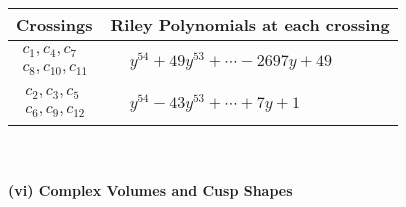 \documentclass[1p]{elsarticle_modified}
\theoremstyle{definition}
\begin{document}
\begin{tabular}{m{50pt}|m{274pt}}
Crossings & \hspace{64pt}Riley Polynomials at each crossing \\
\hline $$\begin{aligned}c_{1},c_{4},c_{7}\\c_{8},c_{10},c_{11}\end{aligned}$$&$\begin{aligned}
&y^{54}+49 y^{53}+\cdots-2697 y+49
\end{aligned}$\\
\hline $$\begin{aligned}c_{2},c_{3},c_{5}\\c_{6},c_{9},c_{12}\end{aligned}$$&$\begin{aligned}
&y^{54}-43 y^{53}+\cdots+7 y+1
\end{aligned}$\\
\hline
\end{tabular}\\~\\
\newpage\flushleft \textbf{(vi) Complex Volumes and Cusp Shapes}
\end{document}

